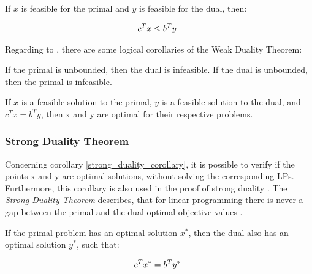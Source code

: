 \begin{theorem}
    If $x$ is feasible for the primal and 
    $y$ is feasible for the dual, then:

    \begin{equation*}
        \begin{array}{ll@{}ll}
            \displaystyle c^{T}x \leq b^{T}y&\\
        \end{array}
    \end{equation*}    

\end{theorem}

Regarding to , there are some logical corollaries 
of the Weak Duality Theorem:

\begin{corollary}
    If the primal is unbounded, then the dual is infeasible. 
    If the dual is unbounded, then the primal is infeasible.
\end{corollary}

\begin{corollary}
\label{strong_duality_corollary}
    If $x$ is a feasible solution to the primal, 
    $y$ is a feasible solution to the dual,
    and $c^{T}x = b^{T}y$, then x and y are optimal for their respective problems.
\end{corollary}

\subsubsection{Strong Duality Theorem}
\label{sec:strong_duality_theorem}
Concerning corollary \ref{strong_duality_corollary}, it is possible to verify if 
the points x and y are optimal solutions, without solving the corresponding LPs. 
Furthermore, this corollary is also used in the proof of strong duality . 
The \textit{Strong Duality Theorem} describes, that for linear programming there 
is never a gap between the primal and the dual 
optimal objective values .

\begin{theorem}
    If  the primal problem has an optimal solution $x^{*}$,
    then the dual also has an optimal solution $y^{*}$,
    such that:

    \begin{equation*}
        \begin{array}{ll@{}ll}
            \displaystyle c^{T}x^{*} = b^{T}y^{*}&\\
        \end{array}
    \end{equation*}    

\end{theorem}

